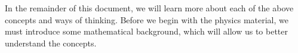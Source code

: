 
%

%


In the remainder of this document, 
we will learn more about each of the above concepts and ways of thinking. 
Before we begin with the physics material, we must introduce some mathematical
background, which will allow us to better understand the concepts.

